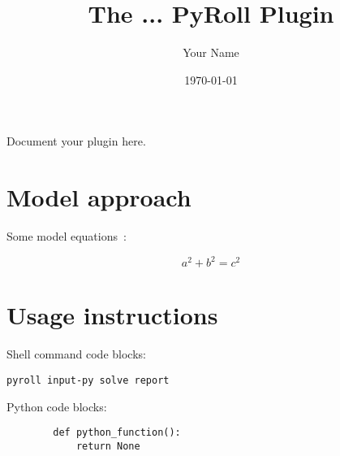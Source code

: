 \documentclass[11pt]{PyRollDocs}
\begin{document}
    \title{The ... PyRoll Plugin}
    \author{Your Name}
    \date{\today}

    \maketitle

    Document your plugin here.


    \section{Model approach}\label{sec:model-approach}

    Some model equations~\cite{article1}:

    \[
        a^2 + b^2 = c^2
    \]


    \section{Usage instructions}\label{sec:usage-instructions}

    Shell command code blocks:

    \begin{verbatim}
pyroll input-py solve report
    \end{verbatim}

    Python code blocks:

    \begin{verbatim}
        def python_function():
            return None
    \end{verbatim}

    \printbibliography
\end{document}

